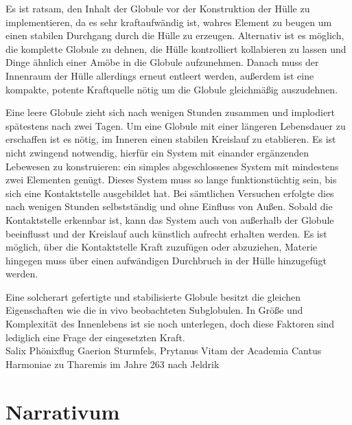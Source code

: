 \documentclass[a5paper,8pt]{book}
\begin{document}
Es ist ratsam, den Inhalt der Globule vor der Konstruktion der Hülle zu implementieren, da es sehr kraftaufwändig ist, 
wahres Element zu beugen um einen stabilen Durchgang durch die Hülle zu erzeugen. Alternativ ist es möglich, die komplette 
Globule zu dehnen, die Hülle  kontrolliert kollabieren zu lassen und Dinge ähnlich einer Amöbe in die Globule aufzunehmen.
Danach muss der Innenraum der Hülle allerdings erneut entleert werden, außerdem ist eine kompakte, potente Kraftquelle 
nötig um die Globule gleichmäßig auszudehnen. 

Eine leere Globule zieht sich nach wenigen Stunden zusammen und implodiert spätestens nach zwei Tagen. Um eine Globule mit 
einer längeren Lebensdauer zu erschaffen ist es nötig, im Inneren einen stabilen Kreislauf zu etablieren. Es ist nicht 
zwingend notwendig, hierfür ein System mit einander ergänzenden Lebewesen zu konstruieren: ein simples abgeschlossenes 
System mit mindestens zwei Elementen genügt. Dieses System muss so lange funktionstüchtig sein, bis sich eine Kontaktstelle 
ausgebildet hat. Bei sämtlichen Versuchen erfolgte dies nach wenigen Stunden selbstständig und ohne Einfluss von Außen. 
Sobald die Kontaktstelle erkennbar ist, kann das System auch von außerhalb der Globule beeinflusst und der Kreislauf auch 
künstlich aufrecht erhalten werden. Es ist möglich, über die Kontaktstelle Kraft zuzufügen oder abzuziehen, Materie 
hingegen muss über einen aufwändigen Durchbruch in der Hülle hinzugefügt werden.

Eine solcherart gefertigte und stabilisierte Globule besitzt die gleichen Eigenschaften wie die in vivo beobachteten 
Subglobulen. In Größe und Komplexität des Innenlebens ist sie noch unterlegen, doch diese Faktoren sind lediglich eine 
Frage der eingesetzten Kraft. \\

Salix Phönixflug
Gaerion Sturmfels,
Prytanus Vitam der
Academia Cantus Harmoniae zu Tharemis im Jahre 263 nach Jeldrik

\newpage

\section{Narrativum}
\end{document}
